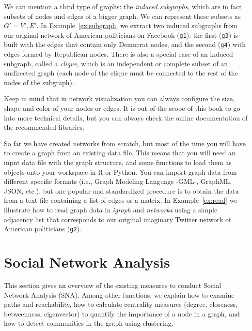 We can  mention a third type of graphs: the \textit{induced subgraphs}, which are in fact subsets of nodes and edges of a bigger graph. We can represent these subsets as $G' = V', E'$. In Example~\ref{ex:subgraph} we extract two induced subgraphs from our original network of American politicians on Facebook (\texttt{g1}): the first (\texttt{g3}) is built with the edges that contain only Democrat nodes, and the second (\texttt{g4}) with edges formed by Republican nodes. There is also a special case of an induced subgraph, called a \textit{clique}, which is an independent or complete subset of an undirected graph (each node of the clique must be connected to the rest of the nodes of the subgraph).


Keep in mind that in network visualization you can always configure the size, shape and color of your nodes or edges. It is out of the scope of this book to go into more technical details, but you can always check the online documentation of the recommended libraries.

So far we have created networks from scratch, but most of the time you will have to create a graph from an existing data file. This means that you will need an input data file with the graph structure, and some functions to load them as objects onto your workspace in R or Python. You can import graph data from different specific formats (i.e., Graph Modeling Language -GML-, GraphML, JSON, etc.), but one popular and standardized procedure is to obtain the data from a text file containing a list of edges or a matrix. In Example~\ref{ex:read}  we illustrate how to read graph data in \emph{igraph} and \emph{networkx} using a simple adjacency list that corresponds to our original imaginary Twitter network of American politicians (\texttt{g2}).


%

\section{Social Network Analysis}
\label{sec:sna}

This section gives an overview of the existing measures to conduct Social Network Analysis (SNA). Among other functions, we explain how to examine paths and reachability, how to calculate centrality measures (degree, closeness, betweenness, eigenvector) to quantify the importance of a node in a graph, and how to detect communities in the graph using clustering.

